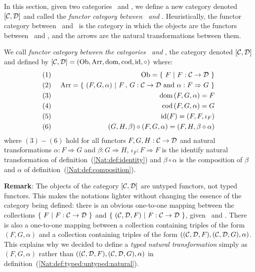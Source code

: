 In this section, given two categories \Cat\ and \Dat, we define a new 
category denoted $[\mbox{$\cal C$},\mbox{$\cal D$}]$ and called the {\em functor category between
\Cat\ and \Dat}. Heuristically, the functor category between \Cat\ and \Dat\
is the category in which the objects are the functors between \Cat\ and \Dat,
and the arrows are the natural transformations between them.
\begin{defin}\label{Nat:def:functor:category}
    We call {\em functor category between the categories \Cat\ and \Dat}, 
    the category denoted $[\mbox{$\cal C$},\mbox{$\cal D$}]$ and  defined by 
    $[\mbox{$\cal C$},\mbox{$\cal D$}]=(\mbox{\rm Ob},\mbox{\rm Arr},\mbox{\rm dom},\mbox{\rm cod},\mbox{\rm id},\circ)$ where:
        \begin{eqnarray*}
            (1)&\ &\ob=\{\ F\ |\ F:\Cat\to\Dat\ \}\\
            (2)&\ &\arr=\{\ (F,G,\alpha)\ |\ F\,,\,G:\Cat\to\Dat\ 
            \mbox{and}\ \alpha:F\Rightarrow G\ \}\\
            (3)&\ &\dom\,(F,G,\alpha)=F\\
            (4)&\ &\cod\,(F,G,\alpha)=G\\
            (5)&\ &\id(F)=(F,F,\iota_{F})\\
            (6)&\ &(G,H,\beta)\circ(F,G,\alpha)=(F,H,\beta\circ\alpha)
        \end{eqnarray*}
    where $(3)-(6)$ hold for all functors $F,G,H:\mbox{$\cal C$}\to\mbox{$\cal D$}$ and natural
    transformations $\alpha:F\Rightarrow G$ and $\beta:G\Rightarrow H$,
    $\iota_{F}:F\Rightarrow F$ is the identify natural transformation 
    of definition~(\ref{Nat:def:identity}) and $\beta\circ\alpha$ is the
    composition of $\beta$ and $\alpha$ of definition~(\ref{Nat:def:composition}).
\end{defin}

\noindent
{\bf Remark}: The objects of the category $[\mbox{$\cal C$},\mbox{$\cal D$}]$ are untyped functors,
not typed functors. This makes the notations lighter without changing
the essence of the category being defined: there is an obvious one-to-one
mapping between the collections $\{\ F\ |\ F:\Cat\to\Dat\ \}$
and $\{\ (\Cat,\Dat,F)\ |\ F:\Cat\to\Dat\ \}$, given \Cat\ and \Dat.
There is also a one-to-one mapping between a collection containing 
triples of the form $(F,G,\alpha)$ and a collection containing triples
of the form $((\mbox{$\cal C$},\mbox{$\cal D$},F),(\mbox{$\cal C$},\mbox{$\cal D$},G),\alpha)$. This explains 
why we decided to define a {\em typed natural transformation} simply
as $(F,G,\alpha)$ rather than $((\mbox{$\cal C$},\mbox{$\cal D$},F),(\mbox{$\cal C$},\mbox{$\cal D$},G),\alpha)$
in definition~(\ref{Nat:def:typed:untyped:natural}).


